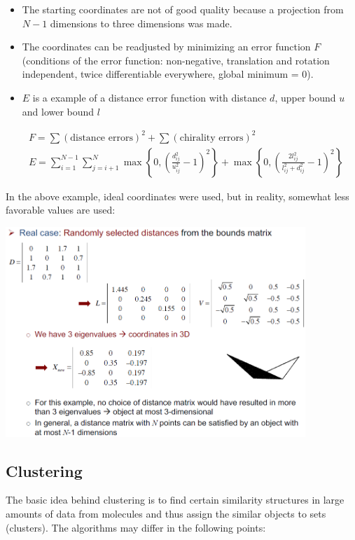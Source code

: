 \begin{enumerate}
\begin{itemize}
        \item The starting coordinates are not of good quality because a projection from $N-1$ dimensions to three dimensions was made.
        \item The coordinates can be readjusted by minimizing an error function $F$ (conditions of the error function: non-negative, translation and rotation independent, twice differentiable everywhere, global minimum = 0). 
        \item $E$ is a example of a distance error function with distance $d$, upper bound $u$ and lower bound $l$
    \end{itemize}
    \begin{align}
        &F=\sum(\text{distance errors})^2+\sum(\text{chirality errors})^2\\&E=\sum_{i=1}^{N-1}\sum_{j=i+1}^{N}\max\left\{0,\left(\frac{d_{ij}^2}{u_{ij}^2}-1\right)^2\right\}+\max\left\{0,\left(\frac{2l_{ij}^2}{l_{ij}^2+d_{ij}^2}-1\right)^2\right\}
    \end{align}
\end{enumerate}

In the above example, ideal coordinates were used, but in reality, somewhat less favorable values are used:

\begin{center}\includegraphics[width=0.85\textwidth]{img/cheminformatics/3dRealCase.png}\end{center}

\subsection{Clustering}

The basic idea behind clustering is to find certain similarity structures in large amounts of data from molecules and thus assign the similar objects to sets (clusters). The algorithms may differ in the following points:

